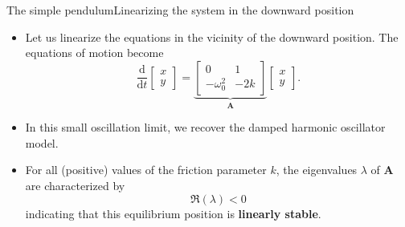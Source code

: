 \documentclass[usenames,dvipsnames,svgnames,10pt,aspectratio=169]{beamer}
\begin{document}
\begin{frame}[t, c]{The simple pendulum}{Linearizing the system in the downward position}
	\begin{minipage}{.68\textwidth}
		\begin{itemize}
			\item Let us linearize the equations in the vicinity of the downward position.
			The equations of motion become
			\[
				\displaystyle \frac{\mathrm{d}}{\mathrm{d}t} \begin{bmatrix} x \\ y \end{bmatrix} = \underbrace{\begin{bmatrix} 0 & 1 \\ -\omega_0^2 & -2k \end{bmatrix}}_{\bm{A}} \begin{bmatrix} x \\ y \end{bmatrix}.
			\]

			\item In this small oscillation limit, we recover the damped harmonic oscillator model.

			\item For all (positive) values of the friction parameter \(k\), the eigenvalues \( \lambda \) of \( \bm{A} \) are characterized by
			\[
				\Re(\lambda) < 0
			\]
			indicating that this equilibrium position is \alert{\textbf{linearly stable}}.
		\end{itemize}
	\end{minipage}%
	\hfill
	\begin{minipage}{.28\textwidth}

	\end{minipage}

	\vspace{1cm}
\end{frame}
\end{document}
